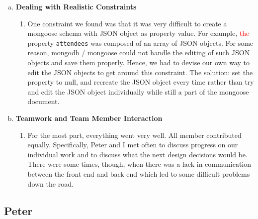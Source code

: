 \documentclass[11pt]{article}   %
\newcommand{\dcomment}[1]{\textcolor{red}{#1}}
\begin{document}
\begin{enumerate} [a)]
\begin{enumerate} [$\cdot$]
\end{enumerate}
\item {\bf Dealing with Realistic Constraints}
\begin{enumerate} [$\cdot$]
\item One constraint we found was that it was very difficult to create a mongoose schema with JSON object as property value. For example, \dcomment{the} property \texttt{attendees} was composed of an array of JSON objects. For some reason, mongodb / mongoose could not handle the editing of such JSON objects and save them properly. Hence, we had to devise our own way to edit the JSON objects to get around this constraint. The solution: set the property to null, and recreate the JSON object every time rather than try and edit the JSON object individually while still a part of the mongoose document.
\end{enumerate}
\item  {\bf Teamwork and Team Member Interaction}
\begin{enumerate} [$\cdot$]
\item For the most part, everything went very well. All member contributed equally. Specifically, Peter and I met often to discuss progress on our individual work and to discuss what the next design decisions would be. There were some times, though, when there was a lack in communication between the front end and back end which led to some difficult problems down the road.
\end{enumerate}
\end{enumerate}

\subsection*{Peter}
\end{document}
